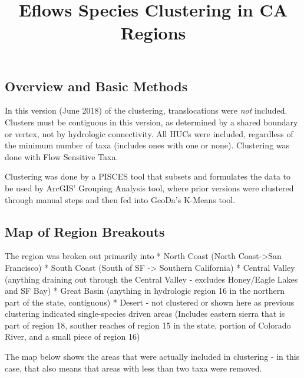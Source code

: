 \documentclass[]{article}
\title{Eflows Species Clustering in CA Regions}
\author{}
\date{}
\begin{document}
\maketitle

\subsection{Overview and Basic
Methods}\label{overview-and-basic-methods}

In this version (June 2018) of the clustering, translocations were
\emph{not} included. Clusters must be contiguous in this version, as
determined by a shared boundary or vertex, not by hydrologic
connectivity. All HUCs were included, regardless of the minimum number
of taxa (includes ones with one or none). Clustering was done with Flow
Sensitive Taxa.

Clustering was done by a PISCES tool that subsets and formulates the
data to be used by ArcGIS' Grouping Analysis tool, where prior versions
were clustered through manual steps and then fed into GeoDa's K-Means
tool.

\subsection{Map of Region Breakouts}\label{map-of-region-breakouts}

The region was broken out primarily into * North Coast (North
Coast-\textgreater{}San Francisco) * South Coast (South of SF
-\textgreater{} Southern California) * Central Valley (anything draining
out through the Central Valley - excludes Honey/Eagle Lakes and SF Bay)
* Great Basin (anything in hydrologic region 16 in the northern part of
the state, contiguous) * Desert - not clustered or shown here as
previous clustering indicated single-species driven areas (Includes
eastern sierra that is part of region 18, souther reaches of region 15
in the state, portion of Colorado River, and a small piece of region 16)

The map below shows the areas that were actually included in clustering
- in this case, that also means that areas with less than two taxa were
removed.
\end{document}
